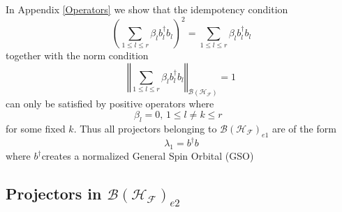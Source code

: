 \documentclass[aps,preprint]{revtex4}%
\begin{document}
In Appendix \ref{Operators} we show that the idempotency condition
\begin{equation}
\left(  \sum_{1\leq l\leq r}\beta_{l}b_{l}^{\dagger}b_{l}\right)  ^{2}%
=\sum_{1\leq l\leq r}\beta_{l}b_{l}^{\dagger}b_{l}%
\end{equation}
together with the norm condition
\begin{equation}
\left\Vert \sum_{1\leq l\leq r}\beta_{l}b_{l}^{\dagger}b_{l}\right\Vert
_{\mathcal{B}\left(  \mathcal{H}_{\mathcal{F}}\right)  }=1
\end{equation}
can only be satisfied by positive operators where
\begin{equation}
\beta_{l}=0,\,1\leq l\neq k\leq r\text{ }%
\end{equation}
for some fixed $k.$ Thus all projectors belonging to $\mathcal{B}\left(
\mathcal{H}_{\mathcal{F}}\right)  _{e1}$ are of the form
\begin{equation}
\lambda_{1}=b^{\dagger}b
\end{equation}
where $b^{\dagger}$creates a normalized General Spin Orbital (GSO)

\subsection{Projectors in $\mathcal{B}\left(  \mathcal{H}_{\mathcal{F}%
}\right)  _{e2}$ \label{Proj2}}
\end{document}
